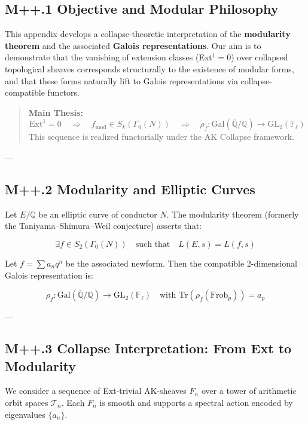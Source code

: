 \documentclass[11pt]{article}
\begin{document}
\begin{axiom}
\begin{axiom}
{{\subsection*{M++.1 Objective and Modular Philosophy}

This appendix develops a collapse-theoretic interpretation of the \textbf{modularity theorem} and the associated \textbf{Galois representations}.  
Our aim is to demonstrate that the vanishing of extension classes (Ext$^1 = 0$) over collapsed topological sheaves corresponds structurally to the existence of modular forms, and that these forms naturally lift to Galois representations via collapse-compatible functors.

\begin{quote}
\textbf{Main Thesis:}  
\[
\mathrm{Ext}^1 = 0 \quad \Rightarrow \quad f_{\text{mod}} \in S_k(\Gamma_0(N)) \quad \Rightarrow \quad \rho_f: \mathrm{Gal}(\bar{\mathbb{Q}}/\mathbb{Q}) \to \mathrm{GL}_2(\mathbb{F}_\ell)
\]
This sequence is realized functorially under the AK Collapse framework.
\end{quote}

---

\subsection*{M++.2 Modularity and Elliptic Curves}

Let $E/\mathbb{Q}$ be an elliptic curve of conductor $N$.  
The modularity theorem (formerly the Taniyama–Shimura–Weil conjecture) asserts that:

\[
\exists f \in S_2(\Gamma_0(N)) \quad \text{such that} \quad L(E,s) = L(f,s)
\]

Let $f = \sum a_n q^n$ be the associated newform. Then the compatible 2-dimensional Galois representation is:

\[
\rho_f: \mathrm{Gal}(\bar{\mathbb{Q}}/\mathbb{Q}) \to \mathrm{GL}_2(\mathbb{F}_\ell)
\quad \text{with } \mathrm{Tr}(\rho_f(\mathrm{Frob}_p)) = a_p
\]

---

\subsection*{M++.3 Collapse Interpretation: From Ext to Modularity}

We consider a sequence of Ext-trivial AK-sheaves $F_n$ over a tower of arithmetic orbit spaces $\mathcal{T}_n$.  
Each $F_n$ is smooth and supports a spectral action encoded by eigenvalues $\{a_n\}$.

}}
\end{axiom}
\end{axiom}
\end{document}
